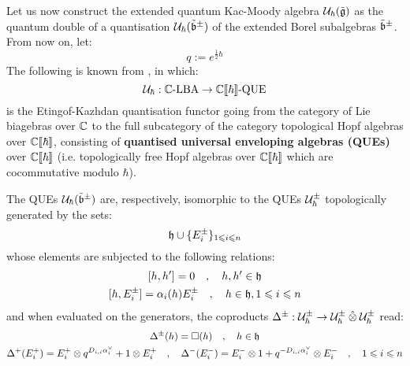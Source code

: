 Let us now construct the extended quantum Kac-Moody algebra $\mathcal{U}_{\hbar}(\tilde{\mathfrak{g}})$ as the quantum double of a quantisation $\mathcal{U}_{\hbar}(\tilde{\mathfrak{b}}^{\pm})$ of the extended Borel subalgebras $\tilde{\mathfrak{b}}^{\pm}$. From now on, let:
    $$q := e^{\frac12 \hbar}$$
The following is known from \cite[Propositions 3.1 and 3.2]{etingof_kazhdan_quantisation_6}, in which:
    $$\mathcal{U}_{\hbar}: \mathbb{C}\text{-}\mathrm{LBA} \to \mathbb{C}[\![\hbar]\!]\text{-}\mathrm{QUE}$$
is the Etingof-Kazhdan quantisation functor going from the category of Lie biagebras over $\mathbb{C}$ to the full subcategory of the category topological Hopf algebras over $\mathbb{C}[\![\hbar]\!]$, consisting of \textbf{quantised universal enveloping algebras (QUEs)} over $\mathbb{C}[\![\hbar]\!]$ (i.e. topologically free Hopf algebras over $\mathbb{C}[\![\hbar]\!]$ which are cocommutative modulo $\hbar$).
\begin{proposition} \label{prop: extended_quantum_borel_subalgebras}
    The QUEs $\mathcal{U}_{\hbar}(\tilde{\mathfrak{b}}^{\pm})$ are, respectively, isomorphic to the QUEs $\mathcal{U}_{\hbar}^{\pm}$ topologically generated by the sets:
        $$\mathfrak{h} \cup \{ E_i^{\pm} \}_{1 \leqslant i \leqslant n}$$
    whose elements are subjected to the following relations:
        \begin{equation} \label{equation: extended_quantum_borel_subalgebras_commutation_relations}
            \begin{gathered}
                [h, h'] = 0 \quad, \quad h, h' \in \h
                \\
                [h, E_i^{\pm}] = \alpha_i(h) E_i^{\pm} \quad, \quad h \in \h, 1 \leq i \leq n 
            \end{gathered} 
        \end{equation}
    and when evaluated on the generators, the coproducts $\Delta^{\pm}: \calU_{\hbar}^{\pm} \to \calU_{\hbar}^{\pm} \hattensor \calU_{\hbar}^{\pm}$ read:
        \begin{equation} \label{equation: extended_quantum_borel_subalgebras_coproducts}
            \begin{gathered}
                \Delta^{\pm}(h) = \Box(h) \quad, \quad h \in \h
                \\
                \Delta^+(E_i^+) = E_i^+ \tensor q^{D_{i, i} \alpha_i^{\vee}} + 1 \tensor E_i^+ \quad, \quad \Delta^-(E_i^-) = E_i^- \tensor 1 + q^{-D_{i, i} \alpha_i^{\vee}} \tensor E_i^- \quad, \quad 1 \leq i \leq n 
            \end{gathered}
        \end{equation}
\end{proposition}